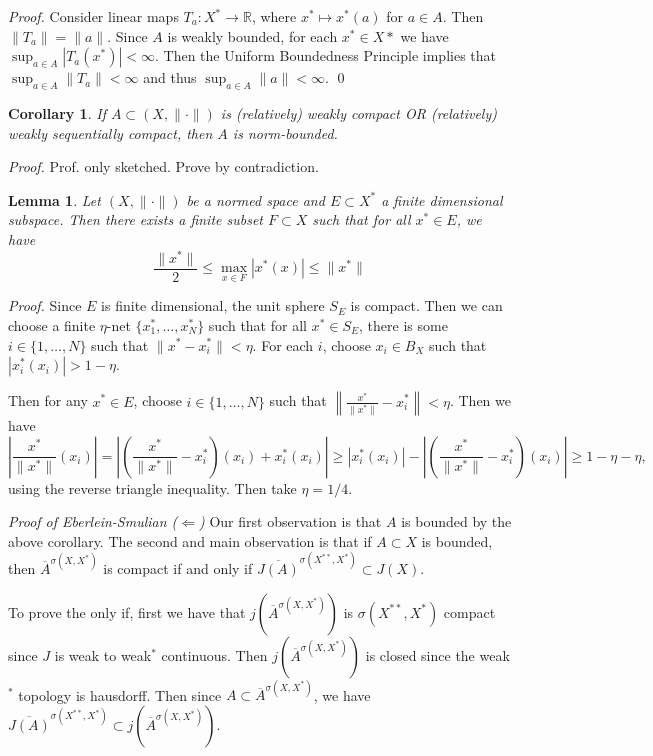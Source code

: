 \documentclass[11pt, reqno]{article}
\theoremstyle{plain}
\newtheorem*{lemma}{Lemma}
\newtheorem*{corollary}{Corollary}
\theoremstyle{definition}
\theoremstyle{remark}
\newcommand{\RR}{\mathbb{R}}
\begin{document}
\textit{Proof.} Consider linear maps $T_a: X^* \rightarrow \RR$, where $x^* \mapsto x^*(a)$ for $a \in A$. 
Then $\|T_a\| = \|a\|$. Since $A$ is weakly bounded, for each $x^* \in X*$ we have 
$\sup_{a \in A} |T_a(x^*)| < \infty$. Then the Uniform Boundedness Principle implies that 
$\sup_{a \in A} \|T_a\| < \infty$ and thus $\sup_{a \in A}\|a\| < \infty$. \hfill\qed

\begin{corollary}
    If $A \subset (X, \|\cdot\|)$ is (relatively) weakly compact OR (relatively) weakly
    sequentially compact, then $A$ is norm-bounded.
\end{corollary}

\textit{Proof.} Prof. only sketched. Prove by contradiction.

\begin{lemma}
    Let $(X, \|\cdot\|)$ be a normed space and $E \subset X^*$ a finite dimensional subspace. Then there 
    exists a finite subset $F \subset X$ such that for all $x^* \in E$, we have 
    \[
        \frac{\|x^*\|}{2}\leq \max\limits_{x \in F}|x^*(x)| \leq \|x^*\|
    \]
\end{lemma}

\textit{Proof.} Since $E$ is finite dimensional, the unit sphere $S_E$ is compact. Then we can 
choose a finite $\eta$-net $\{x_1^*, \dots, x_N^*\}$ such that for all $x^* \in S_E$, there
is some $i \in \{1, \dots, N\}$ such that $\|x^* - x_i^*\| < \eta$. For each $i$, choose
$x_i \in B_X$ such that $|x_i^*(x_i)| > 1 - \eta$.

Then for any $x^* \in E$, choose $i \in \{1, \dots, N\}$ such that $\left\|\frac{x^*}{\|x^*\|} - x_i^*\right\| < \eta$.
Then we have 
\[
    \left|\frac{x^*}{\|x^*\|}(x_i)\right| = \left|\left(\frac{x^*}{\|x^*\|} - x_i^*\right)(x_i) + x_i^*(x_i)\right|
    \geq |x_i^*(x_i)| - \left|\left(\frac{x^*}{\|x^*\|} - x_i^*\right)(x_i)\right| \geq 1 - \eta - \eta,
\]
using the reverse triangle inequality. Then take $\eta = 1/4$.

\bigbreak
\textit{Proof of Eberlein-Smulian ($\Leftarrow$)} Our first observation is that $A$ is bounded by the above corollary. 
The second and main observation is that if $A \subset X$ is bounded, then $\overline{A}^{\sigma(X, X^*)}$ is compact
if and only if $\overline{J(A)}^{\sigma(X^{**}, X^*)} \subset J(X)$.

To prove the only if, first we have that $j(\overline{A}^{\sigma(X,X^*)})$ is $\sigma(X^{**}, X^*)$ 
compact since $J$ is weak to weak$^*$ continuous. Then $j(\overline{A}^{\sigma(X,X^*)})$ is closed
since the weak$^*$ topology is hausdorff. Then since $A \subset \overline{A}^{\sigma(X, X^*)}$, we have 
$\overline{J(A)}^{\sigma(X^{**}, X^*)} \subset j(\overline{A}^{\sigma(X, X^*)})$.
\end{document}
